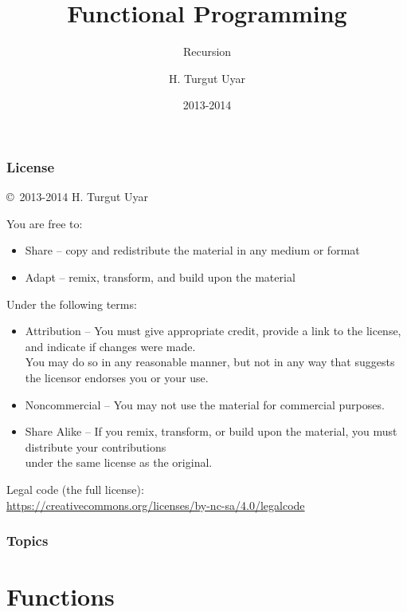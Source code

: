 \documentclass[dvipsnames]{beamer}
\title{Functional Programming}
\subtitle{Recursion}
\author{H. Turgut Uyar}
\date{2013-2014}
\theoremstyle{plain}
\begin{document}

\begin{frame}
  \titlepage
\end{frame}

\begin{frame}
  \frametitle{License}

  \hfill
  \copyright~2013-2014 H. Turgut Uyar

  \vfill
  \begin{tiny}
    You are free to:
    \begin{itemize}
      \item Share -- copy and redistribute the material in any medium or format
      \item Adapt -- remix, transform, and build upon the material
    \end{itemize}

    Under the following terms:
    \begin{itemize}
      \item Attribution -- You must give appropriate credit, provide a link to
        the license, and indicate if changes were made.\\
        You may do so in any reasonable manner, but not in any way
        that suggests the licensor endorses you or your use.

      \item Noncommercial -- You may not use the material for commercial
        purposes.

      \item Share Alike -- If you remix, transform, or build upon the material,
        you must distribute your contributions\\
        under the same license as the original.
    \end{itemize}
  \end{tiny}

  \vfill
  \begin{small}
    Legal code (the full license):\\
    \url{https://creativecommons.org/licenses/by-nc-sa/4.0/legalcode}
  \end{small}
\end{frame}

\begin{frame}
  \frametitle{Topics}
  \tableofcontents
\end{frame}

\section{Functions}
\end{document}
